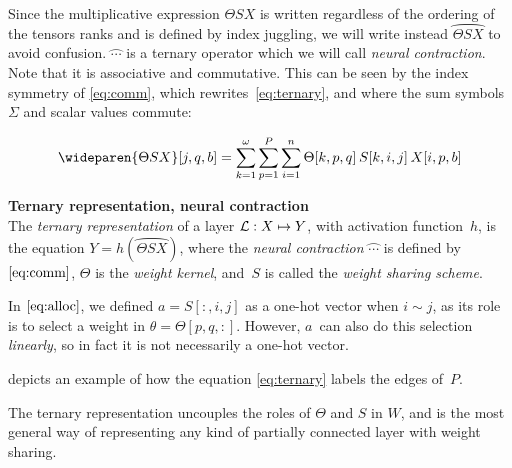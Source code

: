 Since the multiplicative expression $\Theta S X$ is written regardless of the ordering of the tensors ranks and is defined by index juggling, we will write instead $\wideparen{\Theta S X}$ to avoid confusion. $\wideparen{\cdots}$ is a ternary operator which we will call \emph{neural contraction}. Note that it is associative and commutative. This can be seen by the index symmetry of \eqref{eq:comm}, which rewrites~\eqref{eq:ternary}, and where the sum symbols~$\Sigma$ and scalar values commute:

\begin{gather}
\wideparen{\Theta SX}[j,q,b] = \displaystyle \sum_{k=1}^\omega \sum_{p=1}^P \sum_{i=1}^n \Theta[k,p,q] \h{2} S[k,i,j] \h{2} X[i,p,b] \label{eq:comm}
\end{gather}

\begin{definition}\textbf{Ternary representation, neural contraction}\\
The \emph{ternary representation} of a layer $\mathcal{L}: X \mapsto Y$, with activation function~$h$, is the equation $Y = h\left(\wideparen{\Theta S X}\right)$, where the \emph{neural contraction} $\wideparen{\cdots}$ is defined by~$\eqref{eq:comm}$, $\Theta$ is the \emph{weight kernel}, and~$S$ is called the \emph{weight sharing scheme}.
\label{def:ter}
\end{definition}

\begin{remark}
In $\eqref{eq:alloc}$, we defined $a = S[:,i,j]$ as a one-hot vector when $i \sim j$, as its role is to select a weight in $\theta = \Theta[p,q,:]$. However, $a$~can also do this selection \emph{linearly}, so in fact it is not necessarily a one-hot vector.
\end{remark}

 depicts an example of how the equation \eqref{eq:ternary} labels the edges of~$P$.


The ternary representation uncouples the roles of $\Theta$ and $S$ in $W$, and is the most general way of representing any kind of partially connected layer with weight sharing.
